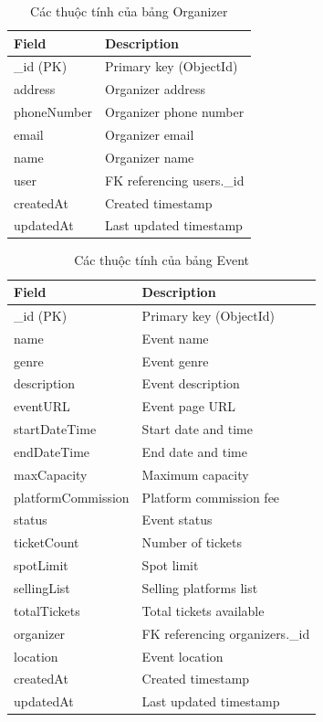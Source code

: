 \begin{table}[H]
\centering
\begin{tabular}{|p{4.5cm}|p{6cm}|}
\hline
\textbf{Field} & \textbf{Description} \\ \hline
\_id (PK) & Primary key (ObjectId) \\ \hline
address & Organizer address \\ \hline
phoneNumber & Organizer phone number \\ \hline
email & Organizer email \\ \hline
name & Organizer name \\ \hline
user & FK referencing users.\_id \\ \hline
createdAt & Created timestamp \\ \hline
updatedAt & Last updated timestamp \\ \hline
\end{tabular}
\vspace{15pt}
\caption{Các thuộc tính của bảng Organizer}
\end{table}

\begin{table}[H]
\centering
\begin{tabular}{|p{4.5cm}|p{6cm}|}
\hline
\textbf{Field} & \textbf{Description} \\ \hline
\_id (PK) & Primary key (ObjectId) \\ \hline
name & Event name \\ \hline
genre & Event genre \\ \hline
description & Event description \\ \hline
eventURL & Event page URL \\ \hline
startDateTime & Start date and time \\ \hline
endDateTime & End date and time \\ \hline
maxCapacity & Maximum capacity \\ \hline
platformCommission & Platform commission fee \\ \hline
status & Event status \\ \hline
ticketCount & Number of tickets \\ \hline
spotLimit & Spot limit \\ \hline
sellingList & Selling platforms list \\ \hline
totalTickets & Total tickets available \\ \hline
organizer & FK referencing organizers.\_id \\ \hline
location & Event location \\ \hline
createdAt & Created timestamp \\ \hline
updatedAt & Last updated timestamp \\ \hline
\end{tabular}
\vspace{15pt}
\caption{Các thuộc tính của bảng Event}
\end{table}

